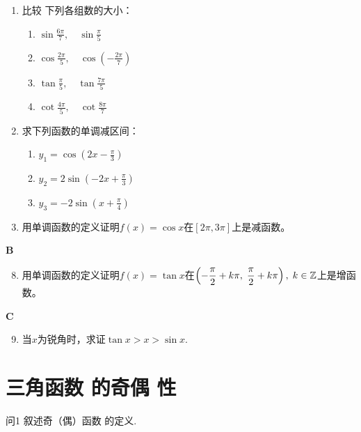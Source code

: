 \begin{enumerate}
\item 比较 下列各组数的大小：
\begin{multicols}{2}
\begin{enumerate}[(1)]
    \item $\sin\frac{6\pi}{7},\quad \sin\frac{\pi}{5}$
    \item $\cos\frac{2\pi}{5},\quad \cos\left(-\frac{2\pi}{7}\right)$
    \item $\tan\frac{\pi}{5},\quad \tan\frac{7\pi}{5}$
    \item $\cot\frac{4\pi}{5},\quad \cot\frac{8\pi}{7}$
\end{enumerate}
\end{multicols}

\item 求下列函数的单调减区间：
\begin{multicols}{2}
\begin{enumerate}[(1)]
    \item $y_1=\cos\left(2x-\frac{\pi}{3}\right)$
    \item $y_2=2\sin\left(-2x+\frac{\pi}{3}\right)$
    \item $y_3=-2\sin\left(x+\frac{\pi}{4}\right)$
\end{enumerate}
\end{multicols}

\item 用单调函数的定义证明$f(x)=\cos x$在$[2\pi,3\pi]$上是减函数。
\end{enumerate}

\begin{center}
    \bfseries B
\end{center}
\begin{enumerate}\setcounter{enumi}{7}
    \item 用单调函数的定义证明$f(x)=\tan x$在$\left(-\dfrac{\pi}{2}+k\pi,\; \dfrac{\pi}{2}+k\pi\right),\; k\in\mathbb{Z}$上是增函数。
\end{enumerate}

\begin{center}
    \bfseries C
\end{center}

\begin{enumerate}\setcounter{enumi}{8}
    \item 当$x$为锐角时，求证$\tan x>x>\sin x$.
\end{enumerate}

\section{三角函数 的奇偶 性}
\begin{thm}{问1}
    叙述奇（偶）函数 的定义. 
\end{thm}

